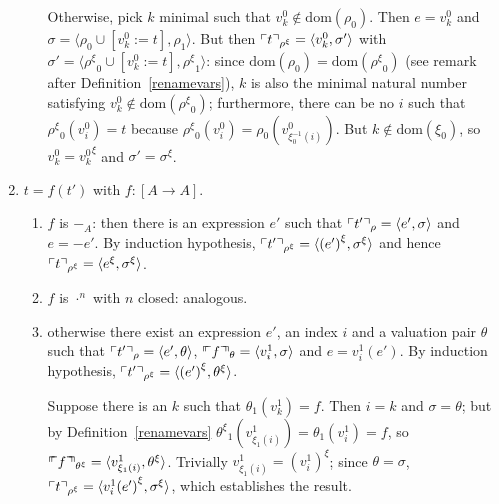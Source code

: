 \documentclass[numreferences]{kluwer}
\newcommand{\mlfnv}[2]{\ensuremath\ulcorner\!\!\ulcorner{#1}\urcorner\!\!\urcorner_{#2}}
\newcommand{\mlfn}[2]{\ensuremath\ulcorner{#1}\urcorner_{#2}}
\newcommand{\domain}{\ensuremath{\mathrm{dom}}}
\newcommand{\renamevar}[2]{\ensuremath{{#1}^{#2}}}
\newcommand{\isrenamevar}[3]{\ensuremath{{#1}=\renamevar{#2}{#3}}}
\begin{document}
\begin{article}
\begin{pf}
\begin{enumerate}
\begin{enumerate}
Otherwise, pick $k$ minimal such that $v^0_k\not\in\domain(\rho_0)$.
Then $e=v^0_k$ and $\sigma=\langle\rho_0\cup[v^0_k:=t],\rho_1\rangle$.
But then $\mlfn{t}{{\renamevar\rho\xi}}=\langle v^0_k,\sigma'\rangle$ with
$\sigma'=\langle\renamevar\rho\xi_0\cup[v^0_k:=t],\renamevar\rho\xi_1\rangle$: since
$\domain(\rho_0)=\domain(\renamevar\rho\xi_0)$ (see remark after
Definition~\ref{renamevars}), $k$ is also the minimal natural number
satisfying $v^0_k\not\in\domain(\renamevar\rho\xi_0)$; furthermore, there can be no
$i$ such that $\renamevar\rho\xi_0(v^0_i)=t$ because
$\renamevar\rho\xi_0(v^0_i)=\rho_0(v^0_{\xi^{-1}_0(i)})$.  But $k\not\in\domain(\xi_0)$,
so {\isrenamevar{v^0_k}{v^0_k}\xi} and {\isrenamevar{\sigma'}\sigma\xi}.
\end{enumerate}
\item $t=f(t')$ with $f:[A\to A]$.
\begin{enumerate}
\item $f$ is $-_A$: then there is an expression $e'$ such that
$\mlfn{t'}{\rho}=\langle e',\sigma\rangle$ and $e=-e'$.
By induction hypothesis,
$\mlfn{t'}{{\renamevar\rho\xi}}=\langle\renamevar{(e')}\xi,\renamevar\sigma\xi\rangle$
and hence $\mlfn{t}{{\renamevar\rho\xi}}=\langle\renamevar e\xi,\renamevar\sigma\xi\rangle$.
\item $f$ is $\cdot^n$ with $n$ closed: analogous.
\item otherwise there exist an expression $e'$, an index $i$ and
a valuation pair $\theta$ such that
$\mlfn{t'}{\rho}=\langle e',\theta\rangle$,
$\mlfnv{f}{\theta}=\langle v^1_i,\sigma\rangle$ and $e=v^1_i(e')$.
By induction hypothesis, $\mlfn{t'}{{\renamevar\rho\xi}}=%
\langle\renamevar{(e')}\xi,\renamevar\theta\xi\rangle$.

Suppose there is an $k$ such that $\theta_1(v^1_k)=f$.  Then $i=k$ and
$\sigma=\theta$; but by Definition~\ref{renamevars}
$\renamevar\theta\xi_1\left(v^1_{\xi_1(i)}\right)=\theta_1(v^1_i)=f$, so
$\mlfnv{f}{\renamevar\theta\xi}=\langle v^1_{\xi_1(i)},\renamevar\theta\xi\rangle$.
Trivially {\isrenamevar{v^1_{\xi_1(i)}}{(v^1_i)}\xi}; since $\theta=\sigma$,
$\mlfn{t}{{\renamevar\rho\xi}}=\langle\renamevar{v^1_i(e')}\xi,\renamevar\sigma\xi\rangle$,
which establishes the result.


\end{enumerate}
\end{enumerate}
\end{pf}
\end{article}
\end{document}

